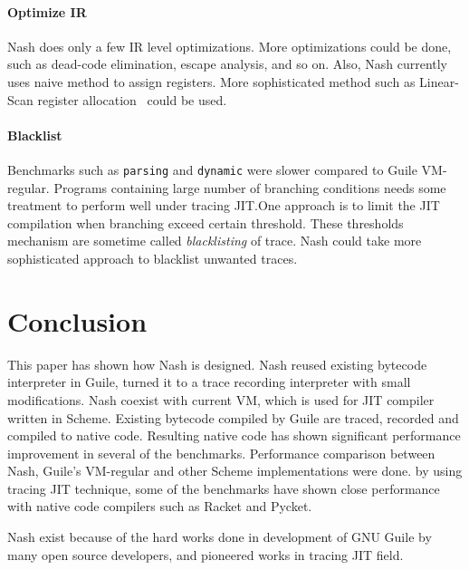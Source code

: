 \documentclass[preprint]{sigplanconf}
\begin{document}
\paragraph{Optimize IR} Nash does only a few IR level optimizations.
More optimizations could be done, such as dead-code elimination, escape
analysis, and so on. Also, Nash currently uses naive method to assign
registers. More sophisticated method such as Linear-Scan register
allocation~\cite{poletto1999linear} could be used.

\paragraph{Blacklist} Benchmarks such as \texttt{parsing} and
\texttt{dynamic} were slower compared to Guile VM-regular. Programs containing
large number of branching conditions needs some treatment to perform well
under tracing JIT.\@ One approach is to limit the JIT compilation when
branching exceed certain threshold. These thresholds mechanism are sometime
called \textit{blacklisting} of trace. Nash could take more sophisticated
approach to blacklist unwanted traces.

\section{Conclusion}
\label{sec:conclusion}
This paper has shown how Nash is designed. Nash reused existing bytecode
interpreter in Guile, turned it to a trace recording interpreter with small
modifications. Nash coexist with current VM, which is used for JIT compiler
written in Scheme. Existing bytecode compiled by Guile are traced, recorded
and compiled to native code. Resulting native code has shown significant
performance improvement in several of the benchmarks.  Performance comparison
between Nash, Guile's VM-regular and other Scheme implementations were
done. by using tracing JIT technique, some of the benchmarks have shown
close performance with native code compilers such as Racket and Pycket.


\acks{} Nash exist because of the hard works done in development of GNU Guile
by many open source developers, and pioneered works in tracing JIT field.







\end{document}

